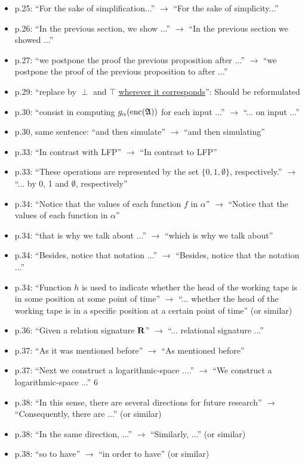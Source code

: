 \begin{itemize}
	\item p.25: ``For the sake of simplification...'' $\to$ ``For the sake of simplicity...''
	\item p.26: ``In the previous section, we show ...'' $\to$ ``In the previous section we showed ...''
	\item p.27: ``we postpone the proof the previous proposition after ...'' $\to$ ``we postpone the proof of
	the previous proposition to after ...''
	\item p.29: ``replace by $\perp$ and $\top$ \underline{wherever it corresponds}'': Should be reformulated
	\item p.30: ``consist in computing $g_{\alpha}({\rm enc}(\mathfrak{A}))$ for each input ...'' $\to$ ``... on input ...''
	\item p.30, same sentence: ``and then simulate'' $\to$ ``and then simulating''
	\item p.33: ``In contrast with LFP'' $\to$ ``In contrast to LFP''
	\item p.33: ``These operations are represented by the set $\{0,1,\emptyset\}$, respectively.'' $\to$ ``... by 0, 1 and
	$\emptyset$, respectively''
	\item p.34: ``Notice that the values of each function $f$ in $\alpha$'' $\to$ ``Notice that the values of each
	function in $\alpha$''
	\item p.34: ``that is why we talk about ...'' $\to$ ``which is why we talk about''
	\item p.34: ``Besides, notice that notation ...'' $\to$ ``Besides, notice that the notation ...''
	\item p.34: ``Function $h$ is used to indicate whether the head of the working tape is in some position
	at some point of time'' $\to$ ``... whether the head of the working tape is in a specific position
	at a certain point of time'' (or similar)
	\item p.36: ``Given a relation signature $\mathbf{R}$'' $\to$ ``... relational signature ...''
	\item p.37: ``As it was mentioned before'' $\to$ ``As mentioned before''
	\item p.37: ``Next we construct a logarithmic-space ....'' $\to$ ``We construct a logarithmic-space ...''
	6
	\item p.38: ``In this sense, there are several directions for future research'' $\to$ ``Consequently, there
	are ...'' (or similar)
	\item p.38: ``In the same direction, ...'' $\to$ ``Similarly, ...'' (or similar)
	\item p.38: ``so to have'' $\to$ ``in order to have'' (or similar)
\end{itemize}
